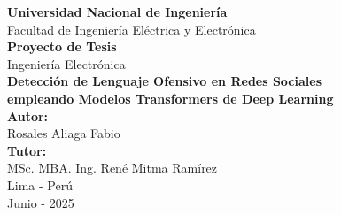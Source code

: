 \begin{titlepage}
    \centering

    {\Large \textbf{Universidad Nacional de Ingeniería}}\\[0.3cm]
    {\large Facultad de Ingeniería Eléctrica y Electrónica}\\[1.8cm]


    {\Large \textbf{Proyecto de Tesis}}\\[0.2cm]
    {\large Ingeniería Electrónica}\\[1.5cm]

    {\Large \textbf{Detección de Lenguaje Ofensivo en Redes Sociales}}\\
    {\Large \textbf{empleando Modelos Transformers de Deep Learning}}\\[1.5cm]

    {\large \textbf{Autor:}}\\[0.2cm]
    {\large Rosales Aliaga Fabio}\\[1cm]

    {\large \textbf{Tutor:}}\\[0.2cm]
    {\large MSc. MBA. Ing. René Mitma Ramírez}\\[1.5cm]

    {\large Lima - Perú}\\
    {\large Junio - 2025}

\end{titlepage}
